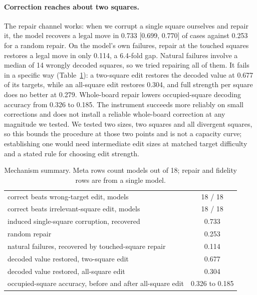 \documentclass[11pt]{article}
\begin{document}
\paragraph{Correction reaches about two squares.}
The repair channel works: when we corrupt a single square ourselves and repair it,
the model recovers a legal move in 0.733 [0.699,
0.770] of cases against 0.253 for a random repair. On the
model's own failures, repair at the touched squares restores a legal move in only
0.114, a 6.4-fold gap. Natural failures involve a
median of 14 wrongly decoded squares, so we tried repairing all
of them. It fails in a specific way (Table~\ref{tab:mechanism}): a two-square edit
restores the decoded value at 0.677 of its targets, while an
all-square edit restores 0.304, and full strength per square does
no better at 0.279. Whole-board repair lowers occupied-square
decoding accuracy from 0.326 to 0.185. The instrument
succeeds more reliably on small corrections and does not install a reliable
whole-board correction at any magnitude we tested. We tested two sizes, two squares
and all divergent squares, so this bounds the procedure at those two points and is
not a capacity curve; establishing one would need intermediate edit sizes at matched
target difficulty and a stated rule for choosing edit strength.

\begin{table}[t]
\centering\small
\caption{Mechanism summary. Meta rows count models out of 18;
repair and fidelity rows are from a single model.}
\label{tab:mechanism}
\begin{tabular}{lc}
\toprule
correct beats wrong-target edit, models          & 18 / 18 \\
correct beats irrelevant-square edit, models     & 18 / 18 \\
\midrule
induced single-square corruption, recovered      & 0.733 \\
\quad random repair                               & 0.253 \\
natural failures, recovered by touched-square repair & 0.114 \\
\midrule
decoded value restored, two-square edit          & 0.677 \\
decoded value restored, all-square edit          & 0.304 \\
occupied-square accuracy, before and after all-square edit & 0.326 to 0.185 \\
\bottomrule
\end{tabular}
\end{table}
\end{document}
